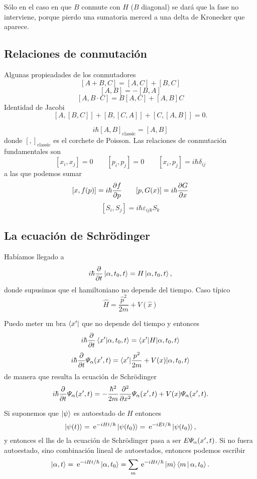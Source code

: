 \documentclass[10pt,oneside]{CBFT_book}
\begin{document}
Sólo en el caso en que $B$ conmute con $H$ ($B$ diagonal) se dará que la fase no interviene,
porque pierdo una sumatoria merced a una delta de Kronecker que aparece.

\subsection{Relaciones de conmutación}

Algunas propieadades de los conmutadores
\[
	[ A + B, C] = [A, C] + [B,C] 
\]
\[
	[A, B] = - [B,A]
\]
\[
	[A, B\cdot C] = B[A,C] +  [A,B]C
\]
Identidad de Jacobi
\[
	[ A, [B,C] ] +  [ B, [C,A] ] + [ C, [A,B] ] = 0.
\]

\[
	i\hbar[ A, B]_{\text{classic}} = [A, B]
\]
donde $[ , ]_{\text{classic}}$ es el corchete de Poisson.
Las relaciones de conmutación fundamentales son 
\[
	[x_i, x_j] = 0 \qquad [p_i, p_j]=0 \qquad [x_i,p_j] =i\hbar\delta_{ij}
\]
a las que podemos sumar
\[
	[x,f(p)] = i\hbar\dpar{f}{p} \qquad [p,G(x)] = i\hbar\dpar{G}{x} 
\]
\[
	[S_i,S_j] = i\hbar \varepsilon_{ijk}S_k
\]

\subsection{La ecuación de Schrödinger}

Habíamos llegado a
\[
	i\hbar\dpar{}{t}\Ket{\alpha,t_0,t} = H\Ket{\alpha,t_0,t},
\]
donde supusimos que el hamiltoniano no depende del tiempo. Caso típico
\[
	\hat{H} = \frac{\hat{p}^2}{2m} + V(\hat{x}) 
\]

Puedo meter un bra $\Bra{x'}$ que no depende del tiempo y entonces 
\[
	i\hbar\dpar{}{t}\braket{x'|\alpha,t_0,t} = \braket{x'|H|\alpha,t_0,t}
\]
\[
	i\hbar\dpar{}{t}\Psi_\alpha(x',t) = \braket{x'|\frac{p^2}{2m} + V(x)|\alpha,t_0,t}
\]
de manera que resulta la ecuación de Schrödinger
\[
	i\hbar\dpar{}{t}\Psi_\alpha(x',t) = -\frac{\hbar^2}{2m}\dpar[2]{}{x}\Psi_\alpha(x',t) + 
	V(x)\Psi_\alpha(x',t).
\]

Si suponemos que $\Ket{\psi}$ es autoestado de $H$ entonces
\[
	\Ket{\psi(t)} = \euler^{-iHt/\hbar} \Ket{\psi(t_0)} = \euler^{-iEt/\hbar} \Ket{\psi(t_0)},
\]
y entonces el lhs de la ecuación de Schrödinger pasa a ser $E \Psi_\a(x',t)$.
Si no fuera autoestado, sino combinación lineal de autoestados, entonces podemos escribir
\[
	\Ket{\a,t} =  \euler^{-iHt/\hbar} \Ket{\a,t_0} = 
	\sum_m \euler^{-iHt/\hbar} \Ket{m}\Braket{m|\a,t_0}.
\]
\end{document}
